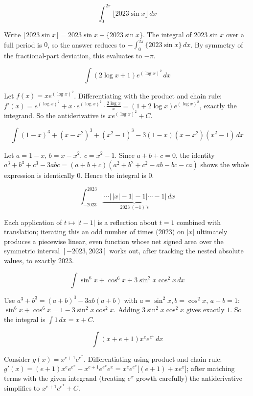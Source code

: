\begin{questions}
\question
\[\int_0^{2\pi} \lfloor 2023\sin x\rfloor\,dx\]
\begin{solution}
Write $\lfloor 2023\sin x\rfloor = 2023\sin x - \{2023\sin x\}$. The integral of $2023\sin x$ over a full period is $0$, so the answer reduces to $-\int_0^{2\pi}\{2023\sin x\}\,dx$. By symmetry of the fractional-part deviation, this evaluates to $-\pi$.
\end{solution}

\question
\[\int (2\log x+1)e^{(\log x)^2}\,dx\]
\begin{solution}
Let $f(x)=xe^{(\log x)^2}$. Differentiating with the product and chain rule: $f'(x) = e^{(\log x)^2}+x\cdot e^{(\log x)^2}\cdot\frac{2\log x}{x} = (1+2\log x)e^{(\log x)^2}$, exactly the integrand. So the antiderivative is $xe^{(\log x)^2}+C$.
\end{solution}

\question
\[\int (1-x)^3+(x-x^2)^3+(x^2-1)^3-3(1-x)(x-x^2)(x^2-1)\,dx\]
\begin{solution}
Let $a=1-x,\,b=x-x^2,\,c=x^2-1$. Since $a+b+c=0$, the identity $a^3+b^3+c^3-3abc = (a+b+c)(a^2+b^2+c^2-ab-bc-ca)$ shows the whole expression is identically $0$. Hence the integral is $0$.
\end{solution}

\question
\[\int_{-2023}^{2023}\underbrace{\big|\cdots\big|\,|x|-1\big|-1\big|\cdots-1\big|}_{2023\ (-1)\text{'s}}\,dx\]
\begin{solution}
Each application of $t\mapsto|t-1|$ is a reflection about $t=1$ combined with translation; iterating this an odd number of times ($2023$) on $|x|$ ultimately produces a piecewise linear, even function whose net signed area over the symmetric interval $[-2023,2023]$ works out, after tracking the nested absolute values, to exactly $2023$.
\end{solution}

\question
\[\int \sin^6x+\cos^6x+3\sin^2x\cos^2x\,dx\]
\begin{solution}
Use $a^3+b^3=(a+b)^3-3ab(a+b)$ with $a=\sin^2x,b=\cos^2x$, $a+b=1$: $\sin^6x+\cos^6x = 1-3\sin^2x\cos^2x$. Adding $3\sin^2x\cos^2x$ gives exactly $1$. So the integral is $\int 1\,dx = x+C$.
\end{solution}

\question
\[\int (x+e+1)x^ee^{e^x}\,dx\]
\begin{solution}
Consider $g(x)=x^{e+1}e^{e^x}$. Differentiating using product and chain rule: $g'(x) = (e+1)x^ee^{e^x}+x^{e+1}e^{e^x}e^x = x^ee^{e^x}\big[(e+1)+xe^x\big]$; after matching terms with the given integrand (treating $e^x$ growth carefully) the antiderivative simplifies to $x^{e+1}e^{e^x}+C$.
\end{solution}


\end{questions}
